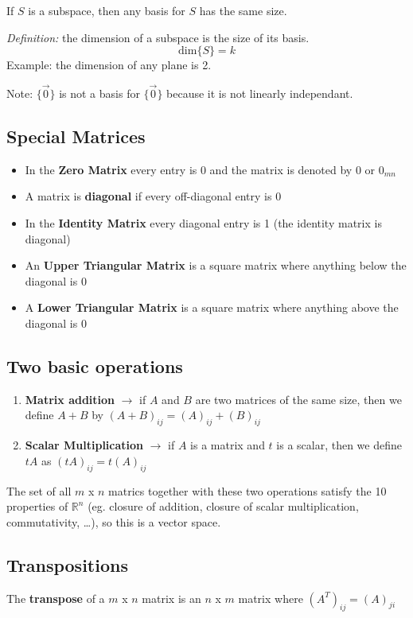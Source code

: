 \documentclass[12pt]{article}
\newcommand{\R}[1]{\mathbb{R}^{#1}}
\begin{document}
\begin{theorem}
If $S$ is a subspace, then any basis for $S$ has the same size.
\end{theorem}

\textit{Definition:} the dimension of a subspace is the size of its basis. \[ \text{dim}\{S\} = k \]
Example: the dimension of any plane is 2.

Note: $\{\vec{0}\}$ is not a basis for $\{\vec{0}\}$ because it is not linearly independant.

\subsection*{Special Matrices}
\begin{itemize}
\item In the {\bf Zero Matrix} every entry is 0 and the matrix is denoted by 0 or $0_{mn}$
\item A matrix is {\bf diagonal} if every off-diagonal entry is 0
\item In the {\bf Identity Matrix} every diagonal entry is 1 (the identity matrix is diagonal)
\item An {\bf Upper Triangular Matrix} is a square matrix where anything below the diagonal is 0
\item A {\bf Lower Triangular Matrix} is a square matrix where anything above the diagonal is 0
\end{itemize}

\subsection*{Two basic operations}
\begin{enumerate}
\item {\bf Matrix addition} $\rightarrow$ if $A$ and $B$ are two matrices of the same size, then we define $A + B$ by $(A + B)_{ij} = (A)_{ij} + (B)_{ij}$
\item {\bf Scalar Multiplication} $\rightarrow$ if $A$ is a matrix and $t$ is a scalar, then we define $tA$ as $(tA)_{ij} = t(A)_{ij}$
\end{enumerate}

The set of all $m$ x $n$ matrics together with these two operations satisfy the 10 properties of $\R{n}$ (eg. closure of addition, closure of scalar multiplication, commutativity, \dots ), so this is a vector space.

\subsection*{Transpositions}
The {\bf transpose} of a $m$ x $n$ matrix is an $n$ x $m$ matrix where $(A^T)_{ij} = (A)_{ji}$
\end{document}
